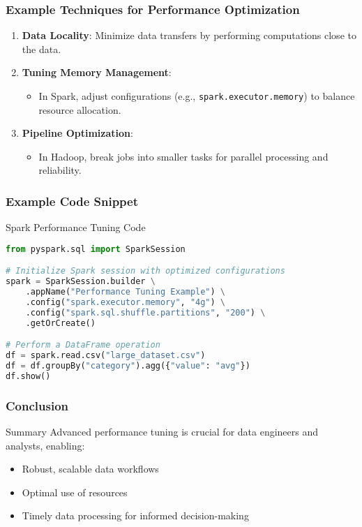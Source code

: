 \documentclass[aspectratio=169]{beamer}
\begin{document}
\begin{frame}[fragile]
    \frametitle{Example Techniques for Performance Optimization}
    \begin{enumerate}
        \item \textbf{Data Locality}: Minimize data transfers by performing computations close to the data.
        \item \textbf{Tuning Memory Management}:
            \begin{itemize}
                \item In Spark, adjust configurations (e.g., \texttt{spark.executor.memory}) to balance resource allocation.
            \end{itemize}
        \item \textbf{Pipeline Optimization}:
            \begin{itemize}
                \item In Hadoop, break jobs into smaller tasks for parallel processing and reliability.
            \end{itemize}
    \end{enumerate}
\end{frame}

\begin{frame}[fragile]
    \frametitle{Example Code Snippet}
    \begin{block}{Spark Performance Tuning Code}
    \begin{lstlisting}[language=python]
from pyspark.sql import SparkSession

# Initialize Spark session with optimized configurations
spark = SparkSession.builder \
    .appName("Performance Tuning Example") \
    .config("spark.executor.memory", "4g") \
    .config("spark.sql.shuffle.partitions", "200") \
    .getOrCreate()

# Perform a DataFrame operation
df = spark.read.csv("large_dataset.csv")
df = df.groupBy("category").agg({"value": "avg"})
df.show()
    \end{lstlisting}
    \end{block}
\end{frame}

\begin{frame}[fragile]
    \frametitle{Conclusion}
    \begin{block}{Summary}
        Advanced performance tuning is crucial for data engineers and analysts, enabling:
        \begin{itemize}
            \item Robust, scalable data workflows
            \item Optimal use of resources 
            \item Timely data processing for informed decision-making
        \end{itemize}
    \end{block}
\end{frame}
\end{document}
